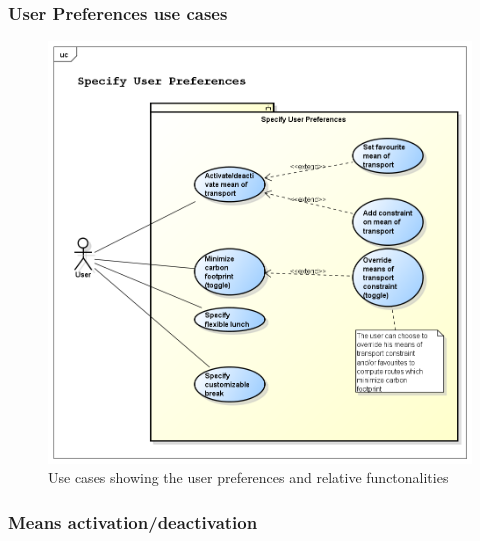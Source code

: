 \subsubsection{User Preferences use cases}
\begin{figure}[htp]
\includegraphics[width=\textwidth]{usecases/png/specifyuserpreferences} 
\caption{Use cases showing the user preferences and relative functonalities} 
\label{fig:specifyuserpreferences} 
\end{figure}

\newpage
\subsubsection{Means activation/deactivation}



